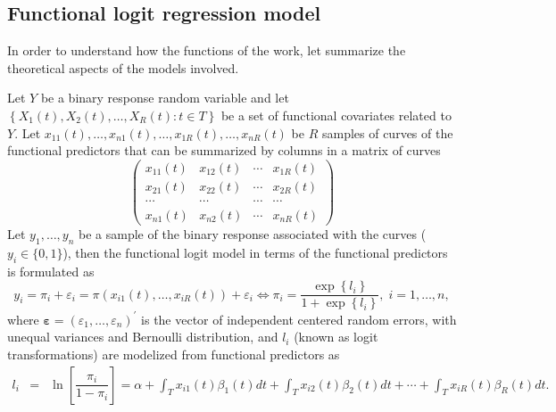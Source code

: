 \subsection{Functional logit regression model}

In order to understand how the functions of the  work, let summarize the theoretical aspects of the models involved.

Let $Y$ be a binary response random variable and let $\left\{ X_1\left( t\right),X_2\left( t\right),\ldots,X_R\left( t\right) :t\in T\right\} $ be a set of functional covariates related to $Y.$ Let $x_{11}\left( t\right) ,\ldots ,x_{n1}\left( t\right),\ldots,x_{1R}\left( t\right) ,\ldots ,x_{nR}\left( t\right) $ be $R$ samples of curves of the functional predictors that can be summarized by columns in a matrix of curves
\begin{equation}
\left( 
\begin{array}{cccc}
x_{11}\left( t\right) & x_{12}\left( t\right) & \cdots & x_{1R}\left(
t\right) \\ 
x_{21}\left( t\right) & x_{22}\left( t\right) & \cdots & x_{2R}\left(
t\right) \\ 
\cdots & \cdots & \cdots & \cdots \\ 
x_{n1}\left( t\right) & x_{n2}\left( t\right) & \cdots & x_{nR}\left(
t\right)
\end{array}
\right) \label{PredictorsMatrix}
\end{equation}
Let $y_{1},\ldots,y_{n}$ be a sample of the binary response associated with the curves ($y_i \in \{0,1\}$), then the functional logit model in terms of the functional predictors is formulated as
\begin{equation}
y_{i}=\pi _{i}+\varepsilon _{i}=\pi \left( x_{i1}\left( t\right),\ldots,x_{iR}\left( t\right) \right)
+\varepsilon _{i} \Leftrightarrow \pi _{i}=\dfrac{\exp \left\{ l_i \right\} }{1+\exp \left\{ l_i\right\} },\;i=1,\ldots ,n,  \label{probfun}
\end{equation}
where $\boldsymbol{\varepsilon} =\left( \varepsilon _{1},\ldots
,\varepsilon _{n}\right)
^{\prime}$ is the vector of independent centered random errors, with unequal variances and Bernoulli distribution, and $l_i$ (known as logit transformations) are modelized from functional predictors as
\begin{eqnarray}
l_{i}&=&\ln \left[ \dfrac{\pi _{i}}{1-\pi _{i}}\right] =\alpha
+\int_{T}x_{i1}\left( t\right) \beta_1 \left( t\right) dt+\int_{T}x_{i2}\left( t\right) \beta_2 \left( t\right) dt+\cdots+\int_{T}x_{iR}\left( t\right) \beta_R \left( t\right) dt.
\end{eqnarray}
